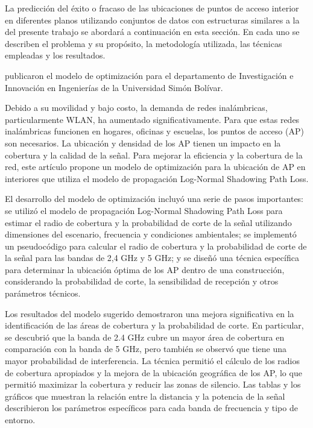 La predicción del éxito o fracaso de las ubicaciones de puntos de acceso interior en diferentes planos utilizando conjuntos de datos con estructuras similares a la del presente trabajo se abordará a continuación en esta sección. En cada uno se describen el problema y su propósito, la metodología utilizada, las técnicas empleadas y los resultados.

\cite{pr_contreras2021modelwlan} publicaron el modelo de optimización   para el departamento de Investigación e Innovación en Ingenierías de la Universidad Simón Bolívar.

Debido a su movilidad y bajo costo, la demanda de redes inalámbricas, particularmente WLAN, ha aumentado significativamente. Para que estas redes inalámbricas funcionen en hogares, oficinas y escuelas, los puntos de acceso (AP) son necesarios. La ubicación y densidad de los AP tienen un impacto en la cobertura y la calidad de la señal. Para mejorar la eficiencia y la cobertura de la red, este artículo propone un modelo de optimización para la ubicación de AP en interiores que utiliza el modelo de propagación Log-Normal Shadowing Path Loss.

El desarrollo del modelo de optimización incluyó una serie de pasos importantes: se utilizó el modelo de propagación Log-Normal Shadowing Path Loss para estimar el radio de cobertura y la probabilidad de corte de la señal utilizando dimensiones del escenario, frecuencia y condiciones ambientales; se implementó un pseudocódigo para calcular el radio de cobertura y la probabilidad de corte de la señal para las bandas de 2,4 GHz y 5 GHz; y se diseñó una técnica específica para determinar la ubicación óptima de los AP dentro de una construcción, considerando la probabilidad de corte, la sensibilidad de recepción y otros parámetros técnicos.

Los resultados del modelo sugerido demostraron una mejora significativa en la identificación de las áreas de cobertura y la probabilidad de corte. En particular, se descubrió que la banda de 2.4 GHz cubre un mayor área de cobertura en comparación con la banda de 5 GHz, pero también se observó que tiene una mayor probabilidad de interferencia. La técnica permitió el cálculo de los radios de cobertura apropiados y la mejora de la ubicación geográfica de los AP, lo que permitió maximizar la cobertura y reducir las zonas de silencio. Las tablas y los gráficos que muestran la relación entre la distancia y la potencia de la señal describieron los parámetros específicos para cada banda de frecuencia y tipo de entorno.

